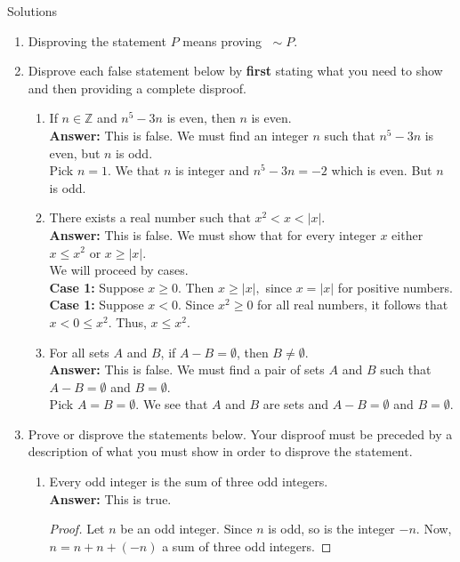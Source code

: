 \documentclass[12pt]{article}
\newcommand{\Z}{\mathbb{Z}}
\begin{document}
Solutions
\begin{enumerate}
\item Disproving the statement $P$ means proving $\; \sim P.$

\item Disprove each false statement below by \textbf{first} stating what you need to show and then providing a complete disproof.
	\begin{enumerate}
	\item If $n \in \Z$ and $n^5-3n$ is even, then $n$ is even.\\
	\textbf{Answer:} This is false. We must find an integer $n$ such that $n^5-3n$ is even, but $n$ is odd.\\
	
	Pick $n=1.$ We that $n$ is integer and $n^5-3n=-2$ which is even. But $n$ is odd.
		\vfill
	\item There exists a real number such that $x^2 < x < |x|.$\\
	\textbf{Answer:} This is false. We must show that for every integer $x$ either $x \leq x^2$ or $x \geq |x|.$\\
	We will proceed by cases.\\
	\textbf{Case 1:} Suppose $x \geq 0.$ Then $x \geq |x|,$ since $x = |x|$ for positive numbers.\\
	\textbf{Case 1:} Suppose $x < 0.$ Since $x^2\geq 0$ for all real numbers, it follows that $x <0\leq x^2.$ Thus, $x \leq x^2.$\\
	\vfill
	\item For all sets $A$ and $B$, if $A-B=\emptyset$, then $B \not = \emptyset.$\\
	\textbf{Answer:} This is false. We must find a pair of sets $A$ and $B$ such that $A-B=\emptyset$ and $B = \emptyset.$\\
	Pick $A=B=\emptyset.$ We see that $A$ and $B$ are sets and $A-B=\emptyset$ and $B=\emptyset.$
	\vfill
	\end{enumerate}
\item Prove or disprove the statements below. Your disproof must be preceded by a description of what you must show in order to disprove the statement.
	\begin{enumerate}
	\item Every odd integer is the sum of three odd integers.\\
	\textbf{Answer:} This is true.\\
	\begin{proof} Let $n$ be an odd integer. Since $n$ is odd, so is the integer $-n.$ Now, $n=n+n+(-n)$ a sum of three odd integers. \end{proof}
	

\end{enumerate}
\end{enumerate}
\end{document}

